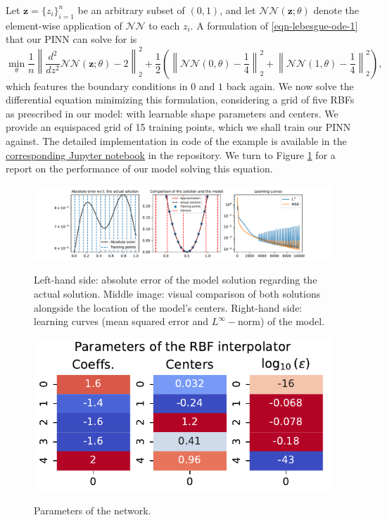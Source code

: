 \documentclass[12pt]{report} %
\newcommand{\tmmathbf}[1]{\ensuremath{\boldsymbol{#1}}}
\begin{document}
Let $\tmmathbf{z}= \{ z_i \}_{i = 1}^n$ be an arbitrary subset of $(0, 1)$,
and let $\mathcal{N}\mathcal{N} (\tmmathbf{z}; \theta)$ denote the
element-wise application of $\mathcal{N}\mathcal{N}$ to each $z_i$. A
formulation of \eqref{eqn-lebesgue-ode-1} that our PINN can solve for is
\[ \min_{\theta}  \frac{1}{n} \left\| \frac{d^2}{d z^2} \mathcal{N}\mathcal{N}
  (\tmmathbf{z}; \theta) - 2 \right\|_2^2 + \frac{1}{2} \left( \left\|
  \mathcal{N}\mathcal{N} (0, \theta) - \frac{1}{4} \right\|_2^2 + \left\|
  \mathcal{N}\mathcal{N} (1, \theta) - \frac{1}{4} \right\|_2^2 \right), \]
which features the boundary conditions in $0$ and $1$ back again. We now solve the
differential equation minimizing this formulation, considering a grid of
five RBFs as prescribed in our model: with learnable shape parameters and centers.
We provide an equispaced grid of 15 training points, which we shall train our
PINN against.
The detailed implementation in code of the example is available in the
\href{https://github.com/heqro/tfm-experiments/blob/main/introductory_notebooks/solving_diff_eqs/1d/ode_example_1.ipynb}{corresponding Jupyter notebook}
in the repository.
We turn to Figure \ref{fig:solution-ode-1d} for a report on the performance of our
model solving this equation.

\begin{figure}[ht]
  \hspace*{-2cm}
  {\includegraphics[width=1.25\textwidth, trim={2cm 0 2.5cm 0}, clip=true]
    {imagenes/experiments/1d/ode/ode_report.pdf}}
  \caption{Left-hand side: absolute error of the model solution regarding the actual
    solution. Middle image: visual comparison of both solutions alongside the location of the
    model's centers.
    Right-hand side: learning curves (mean squared error and $L^\infty-$norm) of the model.}
  \label{fig:solution-ode-1d}
\end{figure}

\begin{figure}
  \caption{Parameters of the network.\label{fig-parameters-ode-1d}}
  {\includegraphics[width=\textwidth]{imagenes/experiments/1d/ode/parameters_of_rbf_interpolator.pdf}}
\end{figure}
\end{document}

